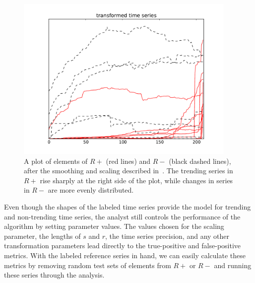 \documentclass{article}
\begin{document}
\begin{figure}
\begin{center}
\includegraphics[width=0.95\textwidth]{fig/nikolov3.pdf} 
\caption{A plot of elements of $R+$ (red lines) and $R-$ (black dashed lines), 
after the smoothing and scaling described in~\cite{Nikolov:2011}.  
The trending series in $R+$ rise sharply at the right side of the plot, 
while changes in series in $R-$ are more evenly distributed.}
\label{fig:reference_series}
\end{center}
\end{figure}

Even though the shapes of the labeled time series provide the model for
trending and non-trending time series, the analyst still controls the performance
of the algorithm by setting parameter values.
The values chosen for the scaling parameter, the lengths of $s$ and $r$, the time series
precision, and any other transformation parameters lead directly to the true-positive
and false-positive metrics. With the labeled reference series
in hand, we can easily calculate these metrics by removing random test sets of 
elements from $R+$ or $R-$ and running these series through the analysis.
\end{document}
